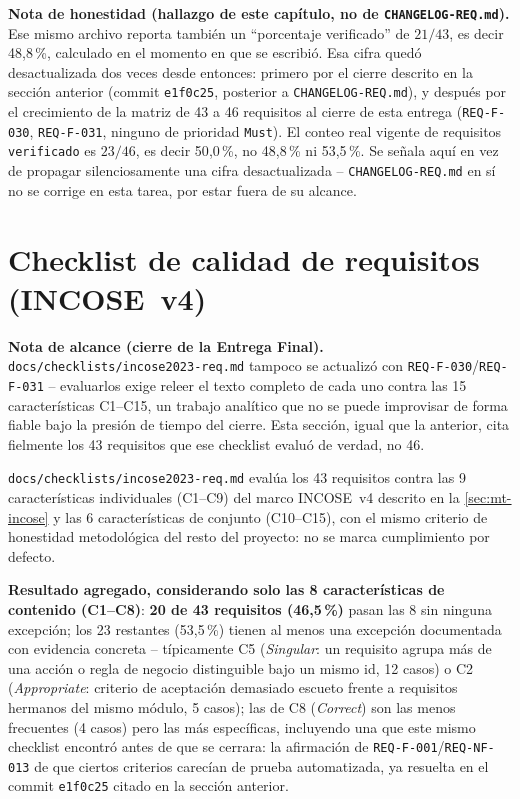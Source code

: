 \textbf{Nota de honestidad (hallazgo de este capítulo, no de
\texttt{CHANGELOG-REQ.md}).} Ese mismo archivo reporta también un
``porcentaje verificado'' de $21/43$, es decir 48{,}8\,\%, calculado en
el momento en que se escribió. Esa cifra quedó desactualizada dos veces
desde entonces: primero por el cierre descrito en la sección anterior
(commit \texttt{e1f0c25}, posterior a \texttt{CHANGELOG-REQ.md}), y
después por el crecimiento de la matriz de 43 a 46 requisitos al cierre
de esta entrega (\texttt{REQ-F-030}, \texttt{REQ-F-031}, ninguno de
prioridad \texttt{Must}). El conteo real vigente de requisitos
\texttt{verificado} es $23/46$, es decir 50{,}0\,\%, no 48{,}8\,\% ni
53{,}5\,\%. Se señala
aquí en vez de propagar silenciosamente una cifra desactualizada --
\texttt{CHANGELOG-REQ.md} en sí no se corrige en esta tarea, por estar
fuera de su alcance.

\section{Checklist de calidad de requisitos (INCOSE~v4)}

\textbf{Nota de alcance (cierre de la Entrega Final).}
\texttt{docs/checklists/incose2023-req.md} tampoco se actualizó con
\texttt{REQ-F-030}/\texttt{REQ-F-031} -- evaluarlos exige releer el
texto completo de cada uno contra las 15 características C1--C15, un
trabajo analítico que no se puede improvisar de forma fiable bajo la
presión de tiempo del cierre. Esta sección, igual que la anterior, cita
fielmente los 43 requisitos que ese checklist evaluó de verdad, no 46.

\texttt{docs/checklists/incose2023-req.md} evalúa los 43 requisitos
contra las 9 características individuales (C1--C9) del marco INCOSE~v4
descrito en la \autoref{sec:mt-incose}
y las 6 características de conjunto (C10--C15), con el mismo criterio de
honestidad metodológica del resto del proyecto: no se marca cumplimiento
por defecto.

\textbf{Resultado agregado, considerando solo las 8 características de
contenido (C1--C8)}: \textbf{20 de 43 requisitos (46{,}5\,\%)} pasan las
8 sin ninguna excepción; los 23 restantes (53{,}5\,\%) tienen al menos
una excepción documentada con evidencia concreta -- típicamente C5
(\emph{Singular}: un requisito agrupa más de una acción o regla de
negocio distinguible bajo un mismo id, 12 casos) o C2
(\emph{Appropriate}: criterio de aceptación demasiado escueto frente a
requisitos hermanos del mismo módulo, 5 casos); las de C8
(\emph{Correct}) son las menos frecuentes (4 casos) pero las más
específicas, incluyendo una que este mismo checklist encontró antes de
que se cerrara: la afirmación de \texttt{REQ-F-001}/\texttt{REQ-NF-013}
de que ciertos criterios carecían de prueba automatizada, ya resuelta en
el commit \texttt{e1f0c25} citado en la sección anterior.

